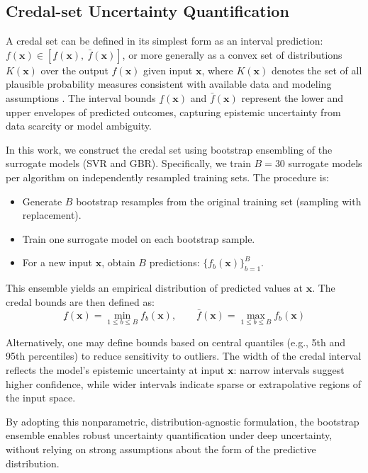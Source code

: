 \documentclass[authoryear,preprint,review,12pt]{elsarticle}
\begin{document}
\subsection{Credal-set Uncertainty Quantification}

A credal set can be defined in its simplest form as an interval prediction:$
f(\bm{x}) \in \left[ \underline{f}(\bm{x}),\ \bar{f}(\bm{x}) \right]$,
or more generally as a convex set of distributions \( K(\bm{x}) \) over the output \( f(\bm{x}) \) given input \( \bm{x} \), where \( K(\bm{x}) \) denotes the set of all plausible probability measures consistent with available data and modeling assumptions \citep{Walley1991}. The interval bounds \( \underline{f}(\bm{x}) \) and \( \bar{f}(\bm{x}) \) represent the lower and upper envelopes of predicted outcomes, capturing epistemic uncertainty from data scarcity or model ambiguity.

In this work, we construct the credal set using bootstrap ensembling of the surrogate models (SVR and GBR). Specifically, we train \( B = 30 \) surrogate models per algorithm on independently resampled training sets. The procedure is:

\begin{itemize}
    \item Generate \( B \) bootstrap resamples from the original training set (sampling with replacement).
    \item Train one surrogate model on each bootstrap sample.
    \item For a new input \( \bm{x} \), obtain \( B \) predictions: \( \{ f_b(\bm{x}) \}_{b=1}^B \).
\end{itemize}

This ensemble yields an empirical distribution of predicted values at \( \bm{x} \). The credal bounds are then defined as:
\begin{equation}
\underline{f}(\bm{x}) = \min_{1 \le b \le B} f_b(\bm{x}), \qquad
\bar{f}(\bm{x}) = \max_{1 \le b \le B} f_b(\bm{x})
\label{eq:credal_bounds}
\end{equation}

Alternatively, one may define bounds based on central quantiles (e.g., 5th and 95th percentiles) to reduce sensitivity to outliers. The width of the credal interval reflects the model’s epistemic uncertainty at input \( \bm{x} \): narrow intervals suggest higher confidence, while wider intervals indicate sparse or extrapolative regions of the input space.

By adopting this nonparametric, distribution-agnostic formulation, the bootstrap ensemble enables robust uncertainty quantification under deep uncertainty, without relying on strong assumptions about the form of the predictive distribution.
\end{document}
